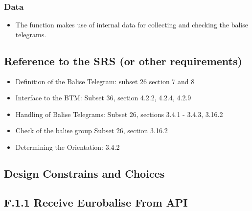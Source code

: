 \documentclass{template/openetcs_report}
\begin{document}
\subsubsection{Data}
\begin{itemize}
\item The function makes use of internal data for collecting and checking the balise telegrams. 
\end{itemize}

\subsection{Reference to the SRS (or other requirements)}
\begin{itemize}
\item Definition of the Balise Telegram: subset 26 section 7 and 8\\
\item Interface to the BTM: Subset 36, section  4.2.2, 4.2.4, 4.2.9\\
\item Handling of Balise Telegrams: Subset 26, sections 3.4.1 - 3.4.3, 3.16.2 \\
\item Check of the balise group Subset 26, section 3.16.2\\
\item Determining the Orientation: 3.4.2\\
\end{itemize}

\subsection{Design Constrains and Choices}


\subsection{F.1.1 Receive Eurobalise From API}\label{ss:ReceiveEurobaliseFromAPI}
\end{document}
